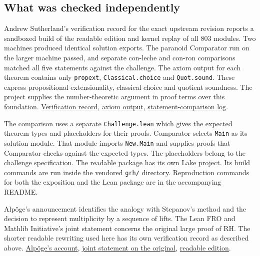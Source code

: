 \documentclass[11pt,letterpaper]{article}
\begin{document}
\subsection{What was checked independently}
Andrew Sutherland's verification record for the exact upstream revision reports a sandboxed build of the readable edition and kernel replay of all 803 modules. Two machines produced identical solution exports. The paranoid Comparator run on the larger machine passed, and separate con-leche and con-ron comparisons matched all five statements against the challenge. The axiom output for each theorem contains only \texttt{propext}, \texttt{Classical.choice} and \texttt{Quot.sound}. These express propositional extensionality, classical choice and quotient soundness. The project supplies the number-theoretic argument in proof terms over this foundation. \href{https://math.mit.edu/~drew/shortgrh/}{Verification record}, \href{https://math.mit.edu/~drew/shortgrh/readable-axioms.log}{axiom output}, \href{https://math.mit.edu/~drew/shortgrh/readable-standalone-con-leche-compare.log}{statement-comparison log}.

The comparison uses a separate \texttt{Challenge.lean} which gives the expected theorem types and placeholders for their proofs. Comparator selects \texttt{Main} as its solution module. That module imports \texttt{New.Main} and supplies proofs that Comparator checks against the expected types. The placeholders belong to the challenge specification. The readable package has its own Lake project. Its build commands are run inside the vendored \texttt{grh/} directory. Reproduction commands for both the exposition and the Lean package are in the accompanying README.

Alpöge's announcement identifies the analogy with Stepanov's method and the decision to represent multiplicity by a sequence of lifts. The Lean FRO and Mathlib Initiative's joint statement concerns the original large proof of RH. The shorter readable rewriting used here has its own verification record as described above. \href{https://alpo.ge/remark.pdf}{Alpöge's account}, \href{https://leanprover-community.github.io/blog/posts/riemann-hypothesis/}{joint statement on the original}, \href{https://github.com/lsernau/grh-lean/tree/72fead102f663d5c7a407964a13dc0cf9d977207/grh}{readable edition}.
\end{document}
